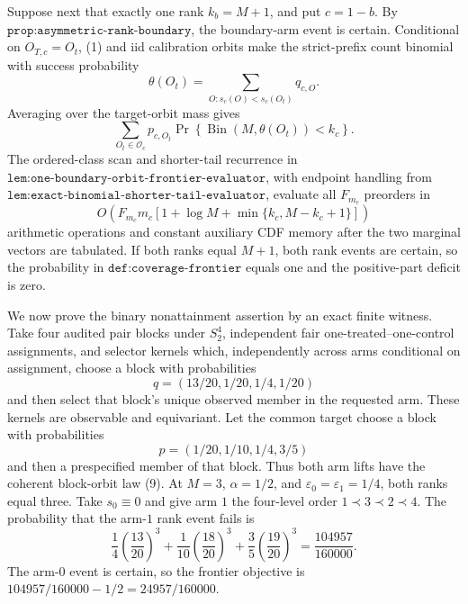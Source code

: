 Suppose next that exactly one rank \(k_b=M+1\), and put \(c=1-b\). By \(\texttt{prop:asymmetric-rank-boundary}\), the boundary-arm event is certain. Conditional on \(O_{T,c}=O_t\), (1) and iid calibration orbits make the strict-prefix count binomial with success probability
\[
\theta(O_t)=\sum_{O:s_c(O)<s_c(O_t)}q_{c,O}.
\tag{5}
\]
Averaging over the target-orbit mass gives
\[
\sum_{O_t\in\mathcal O_c}p_{c,O_t}\Pr\!\left\{\operatorname{Bin}(M,\theta(O_t))<k_c\right\}.
\tag{6}
\]
The ordered-class scan and shorter-tail recurrence in \(\texttt{lem:one-boundary-orbit-frontier-evaluator}\), with endpoint handling from \(\texttt{lem:exact-binomial-shorter-tail-evaluator}\), evaluate all \(F_{m_c}\) preorders in
\[
O\!\left(F_{m_c}m_c[1+\log M+\min\{k_c,M-k_c+1\}]\right)
\tag{7}
\]
arithmetic operations and constant auxiliary CDF memory after the two marginal vectors are tabulated. If both ranks equal \(M+1\), both rank events are certain, so the probability in \(\texttt{def:coverage-frontier}\) equals one and the positive-part deficit is zero.

We now prove the binary nonattainment assertion by an exact finite witness. Take four audited pair blocks under \(S_2^4\), independent fair one-treated--one-control assignments, and selector kernels which, independently across arms conditional on assignment, choose a block with probabilities
\[
q=(13/20,1/20,1/4,1/20)
\tag{8}
\]
and then select that block's unique observed member in the requested arm. These kernels are observable and equivariant. Let the common target choose a block with probabilities
\[
p=(1/20,1/10,1/4,3/5)
\tag{9}
\]
and then a prespecified member of that block. Thus both arm lifts have the coherent block-orbit law (9). At \(M=3\), \(\alpha=1/2\), and \(\varepsilon_0=\varepsilon_1=1/4\), both ranks equal three. Take \(s_0\equiv0\) and give arm \(1\) the four-level order \(1\prec3\prec2\prec4\). The probability that the arm-\(1\) rank event fails is
\[
\frac14\left(\frac{13}{20}\right)^3+\frac1{10}\left(\frac{18}{20}\right)^3+\frac35\left(\frac{19}{20}\right)^3=\frac{104957}{160000}.
\tag{10}
\]
The arm-\(0\) event is certain, so the frontier objective is \(104957/160000-1/2=24957/160000\).

